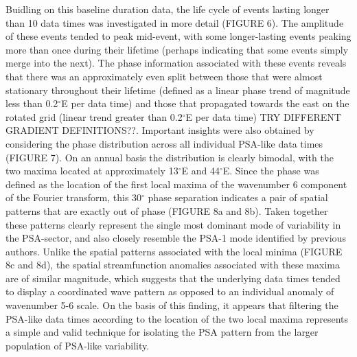 Buidling on this baseline duration data, the life cycle of events lasting longer than 10 data times was investigated in more detail (FIGURE 6). The amplitude of these events tended to peak mid-event, with some longer-lasting events peaking more than once during their lifetime (perhaps indicating that some events simply merge into the next). The phase information associated with these events reveals that there was an approximately even split between those that were almost stationary throughout their lifetime (defined as a linear phase trend of magnitude less than 0.2$^{\circ}$E per data time) and those that propagated towards the east on the rotated grid (linear trend greater than 0.2$^{\circ}$E per data time) TRY DIFFERENT GRADIENT DEFINITIONS??. 
Important insights were also obtained by considering the phase distribution across all individual PSA-like data times (FIGURE 7). On an annual basis the distribution is clearly bimodal, with the two maxima located at approximately 13$^{\circ}$E and 44$^{\circ}$E. Since the phase was defined as the location of the first local maxima of the wavenumber 6 component of the Fourier transform, this 30$^{\circ}$ phase separation indicates a pair of spatial patterns that are exactly out of phase (FIGURE 8a and 8b). Taken together these patterns clearly represent the single most dominant mode of variability in the PSA-sector, and also closely resemble the PSA-1 mode identified by previous authors. Unlike the spatial patterns associated with the local minima (FIGURE 8c and 8d), the spatial streamfunction anomalies associated with these maxima are of similar magnitude, which suggests that the underlying data times tended to display a coordinated wave pattern as opposed to an individual anomaly of wavenumber 5-6 scale. On the basis of this finding, it appears that filtering the PSA-like data times according to the location of the two local maxima represents a simple and valid technique for isolating the PSA pattern from the larger population of PSA-like variability. 


